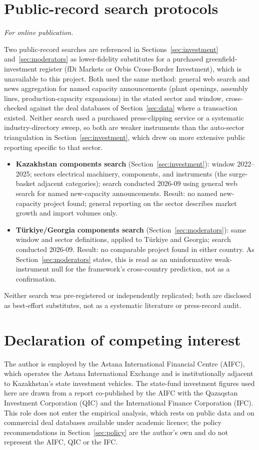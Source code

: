 \documentclass[12pt]{article}
\begin{document}
\section{Public-record search protocols}\label{app:search}
\emph{For online publication.}

\medskip
Two public-record searches are referenced in Sections~\ref{sec:investment}
and~\ref{sec:moderators} as lower-fidelity substitutes for a purchased greenfield-investment
register (fDi Markets or Orbis Cross-Border Investment), which is unavailable to this project.
Both used the same method: general web search and news aggregation for named capacity
announcements (plant openings, assembly lines, production-capacity expansions) in the stated
sector and window, cross-checked against the deal databases of Section~\ref{sec:data} where a
transaction existed. Neither search used a purchased press-clipping service or a systematic
industry-directory sweep, so both are weaker instruments than the auto-sector triangulation
in Section~\ref{sec:investment}, which drew on more extensive public reporting specific to
that sector.

\begin{itemize}
\item \textbf{Kazakhstan components search} (Section~\ref{sec:investment}): window
2022--2025; sectors electrical machinery, components, and instruments (the surge-basket
adjacent categories); search conducted 2026-09 using general web search for named
new-capacity announcements. Result: no named new-capacity project found; general reporting on
the sector describes market growth and import volumes only.
\item \textbf{T\"urkiye/Georgia components search} (Section~\ref{sec:moderators}): same
window and sector definitions, applied to T\"urkiye and Georgia; search conducted 2026-09.
Result: no comparable project found in either country. As Section~\ref{sec:moderators}
states, this is read as an uninformative weak-instrument null for the framework's
cross-country prediction, not as a confirmation.
\end{itemize}

Neither search was pre-registered or independently replicated; both are disclosed as
best-effort substitutes, not as a systematic literature or press-record audit.

\section*{Declaration of competing interest}
The author is employed by the Astana International Financial Centre (AIFC), which operates the
Astana International Exchange and is institutionally adjacent to Kazakhstan's state investment
vehicles. The state-fund investment figures used here are drawn from a report co-published by
the AIFC with the Qazaqstan Investment Corporation (QIC) and the International Finance
Corporation (IFC). This role does not enter the empirical analysis, which rests on public data and
on commercial deal databases available under academic licence; the policy recommendations in
Section~\ref{sec:policy} are the author's own and do not represent the AIFC, QIC or the IFC.
\end{document}
